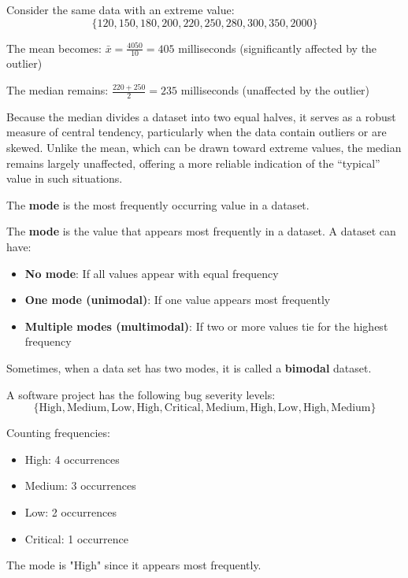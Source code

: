 \begin{example}

Consider the same data with an extreme value:
\[
\{120, 150, 180, 200, 220, 250, 280, 300, 350, 2000\}
\]

The mean becomes: $\bar{x} = \frac{4050}{10} = 405$ milliseconds (significantly affected by the outlier)

The median remains: $\frac{220 + 250}{2} = 235$ milliseconds (unaffected by the outlier)
\end{example}

Because the median divides a dataset into two equal halves, it serves as a robust measure of central tendency, particularly when the data contain outliers or are skewed. Unlike the mean, which can be drawn toward extreme values, the median remains largely unaffected, offering a more reliable indication of the ``typical'' value in such situations.

The \textbf{mode} is the most frequently occurring value in a dataset.

\begin{definition}[Mode]
The \textbf{mode} is the value that appears most frequently in a dataset. A dataset can have:
\begin{itemize}
    \item \textbf{No mode}: If all values appear with equal frequency
    \item \textbf{One mode (unimodal)}: If one value appears most frequently
    \item \textbf{Multiple modes (multimodal)}: If two or more values tie for the highest frequency
\end{itemize}
\end{definition}

Sometimes, when a data set has two modes, it is called a \textbf{bimodal} dataset.

\newpage

\begin{example}

A software project has the following bug severity levels:
\[
\{\text{High}, \text{Medium}, \text{Low}, \text{High}, \text{Critical}, \text{Medium}, \text{High}, \text{Low}, \text{High}, \text{Medium}\}
\]

Counting frequencies:
\begin{itemize}
    \item High: 4 occurrences
    \item Medium: 3 occurrences
    \item Low: 2 occurrences
    \item Critical: 1 occurrence
\end{itemize}

The mode is "High" since it appears most frequently.
\end{example}

